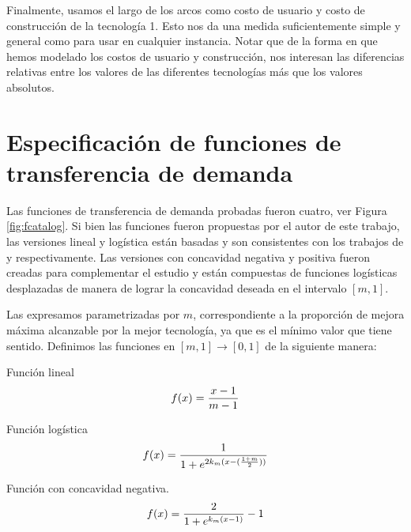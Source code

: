 Finalmente, usamos el largo de los arcos como costo de usuario y costo de construcción de la tecnología 1. Esto nos da una medida suficientemente simple y general como para usar en cualquier instancia. Notar que de la forma en que hemos modelado los costos de usuario y construcción, nos interesan las diferencias relativas entre los valores de las diferentes tecnologías más que los valores absolutos.

\section{Especificación de funciones de transferencia de demanda}
\label{sect:fspecification}

Las funciones de transferencia de demanda probadas fueron cuatro, ver Figura \ref{fig:fcatalog}. Si bien las funciones fueron propuestas por el autor de este trabajo, las versiones lineal y logística están basadas y son consistentes con los trabajos de \textcite{shwe2014} y \textcite{ortuz2011} respectivamente. Las versiones con concavidad negativa y positiva fueron creadas para complementar el estudio y están compuestas de funciones logísticas desplazadas de manera de lograr la concavidad deseada en el intervalo $[m, 1]$.

Las expresamos parametrizadas por $m$, correspondiente a la proporción de mejora máxima alcanzable por la mejor tecnología, ya que es el mínimo valor que tiene sentido. Definimos las funciones en $[m, 1] \rightarrow [0, 1]$ de la siguiente manera:

\begin{definition}
  Función lineal
  \begin{align}
      f(x) = {x -1 \over m - 1}
  \end{align}
\end{definition}

\begin{definition}
  Función logística
  \begin{align}
      f(x) = {1 \over 1 + e^{2k_m(x - ({1 + m \over 2}))}}
  \end{align}
\end{definition}

\begin{definition}
  Función con concavidad negativa.
  \begin{align}
      f(x) = {2 \over 1 + e^{k_m(x - 1)}} - 1
  \end{align}
\end{definition}

